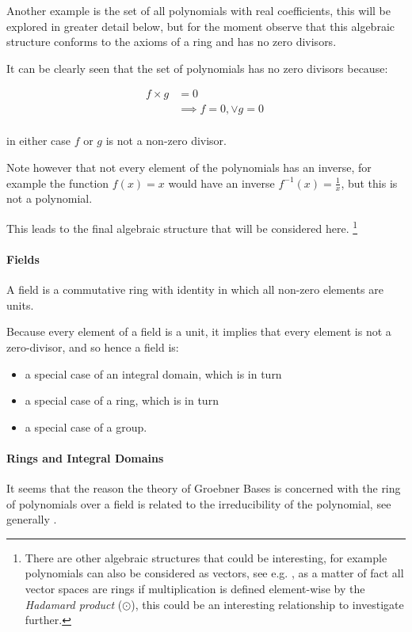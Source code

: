 \documentclass[a4paper,11pt,twoside]{article}
\begin{document}
Another example is the set of all polynomials with real
coefficients, this will be explored in greater detail below, but
for the moment observe that this algebraic structure conforms to
the axioms of a ring and has no zero divisors.

It can be clearly seen that the set of polynomials has no zero
divisors because:

\begin{align}
f \times g &= 0 \\
&\implies f = 0, \lor g = 0 \ \\
\end{align}

in either case \(f\) or \(g\) is not a non-zero divisor.

Note however that not every element of the polynomials has an
inverse, for example the function \(f(x)=x\) would have an inverse
\(f^{-1}(x)=\frac{1}{x}\), but this is not a polynomial.

This leads to the final algebraic structure that will be considered
here. \footnote{There are other algebraic structures that could be interesting,
for example polynomials can also be considered as vectors, see
e.g. \cite{larsonElementaryLinearAlgebra1991a}, as a matter of fact all
vector spaces are rings if multiplication is defined element-wise by
the \emph{Hadamard product} (\(\odot\)), this could be an interesting
relationship to investigate further.}
\paragraph{Fields}
\label{sec:org98dc659}
A field is a commutative ring with identity in which all non-zero
elements are units.

Because every element of a field is a unit, it
implies that every element is not a zero-divisor, and so hence a
field is:

\begin{itemize}
\item a special case of an integral domain, which is in turn
\item a special case of a ring, which is in turn
\item a special case of a group.
\end{itemize}

\paragraph{Rings and Integral Domains}
\label{sec:org6433384}
It seems that the reason the theory of Groebner Bases is concerned
with the ring of polynomials over a field is related to the
irreducibility of the polynomial, see generally \cite{EquivalenceDefinitionsIrreducible}.
\end{document}
